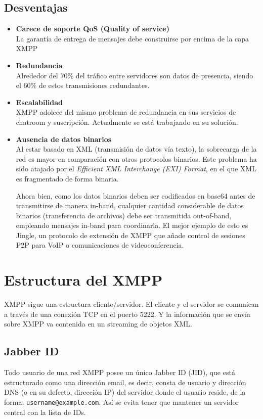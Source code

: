 \documentclass[a4paper, 11pt]{article} %
\begin{document}
   \subsection{Desventajas}
   \begin{itemize}
    \item \textbf{Carece de soporte QoS (Quality of service)}\\
    La garantía de entrega de mensajes debe construirse por encima de la capa XMPP
    \item \textbf{Redundancia}\\
    Alrededor del 70\% del tráfico entre servidores son datos de presencia, siendo el 60\% de estos transmisiones 
    redundantes.
    \item \textbf{Escalabilidad}\\
    XMPP adolece del mismo problema de redundancia en sus servicios de chatroom y suscripción. Actualmente se está
    trabajando en su solución.
    \item \textbf{Ausencia de datos binarios}\\
    Al estar basado en XML (transmisión de datos vía texto), la sobrecarga de la red es mayor en comparación 
    con otros protocolos binarios. Este problema ha sido atajado por el \textit{Efficient XML Interchange (EXI) Format},
    en el que XML es fragmentado de forma binaria.
    
    Ahora bien, como los datos binarios deben ser codificados en base64 antes de transmitirse de manera in-band,
    cualquier cantidad considerable de datos binarios (transferencia de archivos) debe ser transmitida out-of-band,
    empleando mensajes in-band para coordinarla. El mejor ejemplo de esto es Jingle, un protocolo de extensión de XMPP
    que añade control de sesiones P2P para VoIP o comunicaciones de videoconferencia.
    
   \end{itemize}


\section{Estructura del XMPP}
  XMPP sigue una estructura cliente/servidor. El cliente y el servidor se comunican a través 
  de una conexión TCP en el puerto 5222. Y la información que se envía sobre XMPP va contenida
  en un streaming de objetos XML.
  
  \subsection{Jabber ID}
  Todo usuario de una red XMPP posee un único Jabber ID (JID), que está estructurado como una dirección email, es decir, 
  consta de usuario y dirección DNS (o en su defecto, dirección IP) del servidor donde el usuario reside, de la forma:
  \texttt{username@example.com}. Así se evita tener que mantener un servidor central con la lista de IDs.
  
\end{document}
